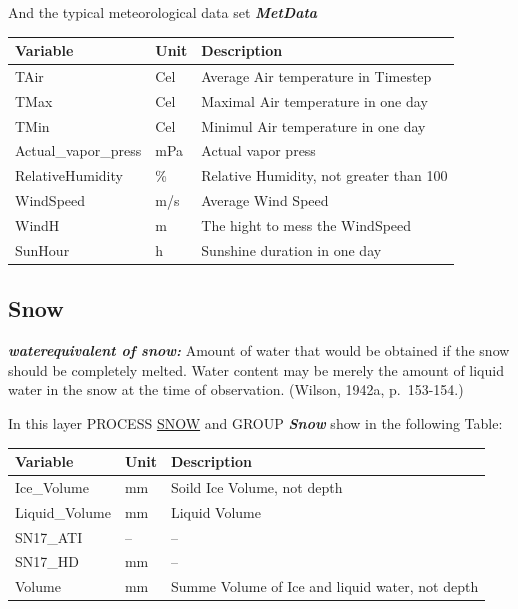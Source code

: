 \documentclass[
]{book}
\begin{document}
And the typical meteorological data set \textbf{\emph{MetData}}

\begin{table}[!h]
\centering
\begin{tabular}{l|l|l}
\hline
Variable & Unit & Description\\
\hline
TAir & Cel & Average Air temperature in Timestep\\
\cline{1-3}
TMax & Cel & Maximal Air temperature in one day\\
\cline{1-3}
TMin & Cel & Minimul Air temperature in one day\\
\cline{1-3}
Actual\_vapor\_press & mPa & Actual vapor press\\
\cline{1-3}
RelativeHumidity & \% & Relative Humidity, not greater than 100\\
\cline{1-3}
WindSpeed & m/s & Average Wind Speed\\
\cline{1-3}
WindH & m & The hight to mess the WindSpeed\\
\cline{1-3}
SunHour & h & Sunshine duration in one day\\
\hline
\end{tabular}
\end{table}

\hypertarget{Snow1}{%
\subsection{Snow}\label{Snow1}}

\textbf{\emph{waterequivalent of snow:}} Amount of water that would be obtained if the snow should be completely melted. Water content may be merely the amount of liquid water in the snow at the time of observation. (Wilson, 1942a, p.~153-154.)

In this layer PROCESS \protect\hyperlink{SNOW}{SNOW} and GROUP \textbf{\emph{Snow}} show in the following Table:

\begin{table}[!h]
\centering
\begin{tabular}{l|l|l}
\hline
Variable & Unit & Description\\
\hline
Ice\_Volume & mm & Soild Ice Volume, not depth\\
\cline{1-3}
Liquid\_Volume & mm & Liquid Volume\\
\cline{1-3}
SN17\_ATI & -- & --\\
\cline{1-3}
SN17\_HD & mm & --\\
\cline{1-3}
Volume & mm & Summe Volume of Ice and liquid water, not depth\\
\hline
\end{tabular}
\end{table}
\end{document}

